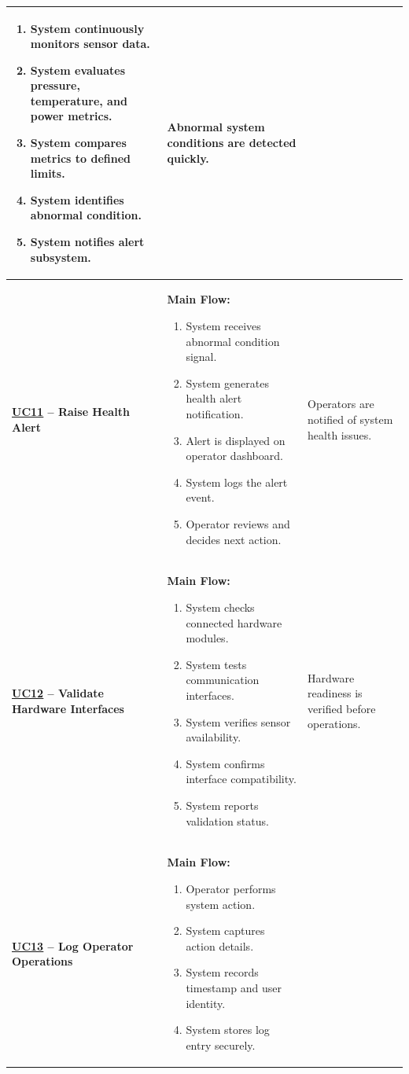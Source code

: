\documentclass[11pt,a4paper]{article}
\let\orighyperref\hyperref
\renewcommand{\hyperref}[2][]{\orighyperref[#1]{\uline{#2}}}%
\begin{document}
\begin{longtable}{|>{\raggedright\arraybackslash}p{}|>{\raggedright\arraybackslash}p{}|>{\raggedright\arraybackslash}p{}|}
\begin{enumerate}[leftmargin=*,nosep]
  \item System continuously monitors sensor data.
  \item System evaluates pressure, temperature, and power metrics.
  \item System compares metrics to defined limits.
  \item System identifies abnormal condition.
  \item System notifies alert subsystem.
\end{enumerate} & Abnormal system conditions are detected quickly. \\
\hline
\textbf{\hyperref[fig:usecase-diagram-pdf]{UC11} -- Raise Health Alert} & \textbf{Main Flow:}\begin{enumerate}[leftmargin=*,nosep]
  \item System receives abnormal condition signal.
  \item System generates health alert notification.
  \item Alert is displayed on operator dashboard.
  \item System logs the alert event.
  \item Operator reviews and decides next action.
\end{enumerate} & Operators are notified of system health issues. \\
\hline
\textbf{\hyperref[fig:usecase-diagram-pdf]{UC12} -- Validate Hardware Interfaces} & \textbf{Main Flow:}\begin{enumerate}[leftmargin=*,nosep]
  \item System checks connected hardware modules.
  \item System tests communication interfaces.
  \item System verifies sensor availability.
  \item System confirms interface compatibility.
  \item System reports validation status.
\end{enumerate} & Hardware readiness is verified before operations. \\
\hline
\textbf{\hyperref[fig:usecase-diagram-pdf]{UC13} -- Log Operator Operations} & \textbf{Main Flow:}\begin{enumerate}[leftmargin=*,nosep]
  \item Operator performs system action.
  \item System captures action details.
  \item System records timestamp and user identity.
  \item System stores log entry securely.

\end{enumerate}
\end{longtable}
\end{document}
